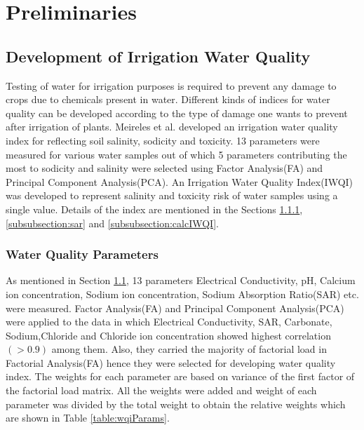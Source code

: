 \section{Preliminaries}
\label{section:preliminaries}

\subsection{Development of Irrigation Water Quality}
\label{subsection:devIWQI}
Testing of water for irrigation purposes is required to prevent any damage to crops due to chemicals present in water. Different kinds of indices for water quality can be developed according to the type of damage one wants to prevent after irrigation of plants. Meireles et al. developed an irrigation water quality index for reflecting soil salinity, sodicity and toxicity. 13 parameters were measured for various water samples out of which 5 parameters contributing the most to sodicity and salinity were selected using Factor Analysis(FA) and Principal Component Analysis(PCA). An Irrigation Water Quality Index(IWQI) was developed to represent salinity and toxicity risk of water samples using a single value. Details of the index are mentioned in the Sections \ref{subsubsection:WaterQualityParameters}, \ref{subsubsection:sar} and \ref{subsubsection:calcIWQI}. 

\subsubsection{Water Quality Parameters}
\label{subsubsection:WaterQualityParameters}
As mentioned in Section \ref{subsection:devIWQI}, 13 parameters Electrical Conductivity, pH, Calcium ion concentration, Sodium ion concentration, Sodium Absorption Ratio(SAR) etc. were measured. Factor Analysis(FA) and Principal Component Analysis(PCA) were applied to the data in which Electrical Conductivity, SAR, Carbonate, Sodium,Chloride and Chloride ion concentration showed highest correlation$(>0.9)$ among them. Also, they carried the majority of factorial load in Factorial Analysis(FA) hence they were selected for developing water quality index. The weights for each parameter are based on variance of the first factor of the factorial load matrix\cite{article:irrigationWaterQuality}. All the weights were added and weight of each parameter was divided by the total weight to obtain the relative weights which are shown in Table \ref{table:wqiParams}. 

